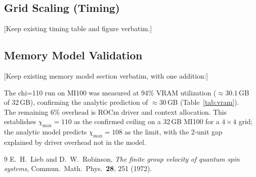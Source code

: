 \documentclass[11pt]{article}
\newcommand{\chimax}{\chi_{\mathrm{max}}}
\begin{document}
\subsection{Grid Scaling (Timing)}
\label{sec:grid_timing}

[Keep existing timing table and figure verbatim.]

\subsection{Memory Model Validation}
\label{sec:memory_validation}

[Keep existing memory model section verbatim, with one addition:]

The chi=110 run on MI100 was measured at 94\% VRAM utilization
($\approx 30.1$\,GB of 32\,GB), confirming the analytic prediction
of $\approx 30$\,GB (Table~\ref{tab:vram}).
The remaining 6\% overhead is ROCm driver and context allocation.
This establishes $\chimax = 110$ as the confirmed ceiling on a 32\,GB MI100
for a $4\times4$ grid; the analytic model predicts $\chimax = 108$ as the
limit, with the 2-unit gap explained by driver overhead not in the model.


\begin{thebibliography}{9}
E.~H.~Lieb and D.~W.~Robinson,
\textit{The finite group velocity of quantum spin systems},
Commun.\ Math.\ Phys.\ \textbf{28}, 251 (1972).
\end{thebibliography}
\end{document}
